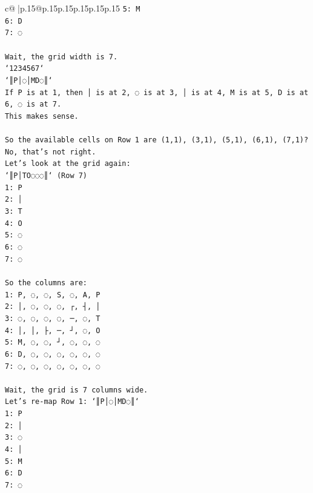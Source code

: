 \documentclass{article}
\begin{document}
{\begin{supertabular}{c@{$\;$}|p{.15\linewidth}@{}p{.15\linewidth}p{.15\linewidth}p{.15\linewidth}p{.15\linewidth}p{.15\linewidth}}
{{{\texttt{5: M} \\
\texttt{6: D} \\
\texttt{7: ◌} \\
\\ 
\texttt{Wait, the grid width is 7.} \\
\texttt{`1234567`} \\
\texttt{`║P│◌│MD◌║`} \\
\texttt{If P is at 1, then │ is at 2, ◌ is at 3, │ is at 4, M is at 5, D is at 6, ◌ is at 7.} \\
\texttt{This makes sense.} \\
\\ 
\texttt{So the available cells on Row 1 are (1,1), (3,1), (5,1), (6,1), (7,1)? No, that's not right.} \\
\texttt{Let's look at the grid again:} \\
\texttt{`║P│TO◌◌◌║` (Row 7)} \\
\texttt{1: P} \\
\texttt{2: │} \\
\texttt{3: T} \\
\texttt{4: O} \\
\texttt{5: ◌} \\
\texttt{6: ◌} \\
\texttt{7: ◌} \\
\\ 
\texttt{So the columns are:} \\
\texttt{1: P, ◌, ◌, S, ◌, A, P} \\
\texttt{2: │, ◌, ◌, ◌, ┌, ┤, │} \\
\texttt{3: ◌, ◌, ◌, ◌, ─, ◌, T} \\
\texttt{4: │, │, ├, ─, ┘, ◌, O} \\
\texttt{5: M, ◌, ◌, ┘, ◌, ◌, ◌} \\
\texttt{6: D, ◌, ◌, ◌, ◌, ◌, ◌} \\
\texttt{7: ◌, ◌, ◌, ◌, ◌, ◌, ◌} \\
\\ 
\texttt{Wait, the grid is 7 columns wide.} \\
\texttt{Let's re{-}map Row 1: `║P│◌│MD◌║`} \\
\texttt{1: P} \\
\texttt{2: │} \\
\texttt{3: ◌} \\
\texttt{4: │} \\
\texttt{5: M} \\
\texttt{6: D} \\
\texttt{7: ◌} \\
}}}
\end{supertabular}}
\end{document}
